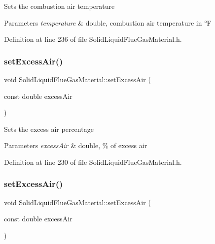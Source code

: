 Sets the combustion air temperature 
\begin{DoxyParams}{Parameters}
{\em temperature} & double, combustion air temperature in °F \\
\hline
\end{DoxyParams}


Definition at line 236 of file Solid\+Liquid\+Flue\+Gas\+Material.\+h.

\mbox{\label{class_solid_liquid_flue_gas_material_a7a3f9f77d267afc05f5fde1da9329ec5}} 
\subsubsection{\texorpdfstring{set\+Excess\+Air()}{setExcessAir()}\hspace{0.1cm}{\footnotesize\ttfamily [1/3]}}
{\footnotesize\ttfamily void Solid\+Liquid\+Flue\+Gas\+Material\+::set\+Excess\+Air (\begin{DoxyParamCaption}\item[{const double}]{excess\+Air }\end{DoxyParamCaption})\hspace{0.3cm}{\ttfamily [inline]}}

Sets the excess air percentage 
\begin{DoxyParams}{Parameters}
{\em excess\+Air} & double, \% of excess air \\
\hline
\end{DoxyParams}


Definition at line 230 of file Solid\+Liquid\+Flue\+Gas\+Material.\+h.

\mbox{\label{class_solid_liquid_flue_gas_material_a7a3f9f77d267afc05f5fde1da9329ec5}} 
\subsubsection{\texorpdfstring{set\+Excess\+Air()}{setExcessAir()}\hspace{0.1cm}{\footnotesize\ttfamily [2/3]}}
{\footnotesize\ttfamily void Solid\+Liquid\+Flue\+Gas\+Material\+::set\+Excess\+Air (\begin{DoxyParamCaption}\item[{const double}]{excess\+Air }\end{DoxyParamCaption})\hspace{0.3cm}{\ttfamily [inline]}}

